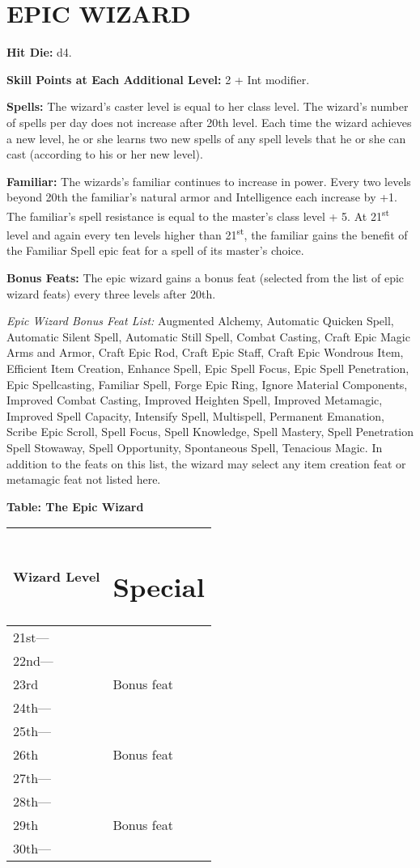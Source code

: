 \documentclass{article}
\begin{document}
\section*{{\LARGE{}EPIC WIZARD }}

\textbf{Hit Die:} d4. 

\textbf{Skill Points at Each Additional Level:} 2 + Int modifier. 

\textbf{Spells:} The wizard's caster level is equal to her class level. The wizard's 
number of spells per day does not increase after 20th level. Each time the wizard 
achieves a new level, he or she learns two new spells of any spell levels that 
he or she can cast (according to his or her new level). 

\textbf{Familiar:} The wizards's familiar continues to increase in power. Every 
two levels beyond 20th the familiar's natural armor and Intelligence each increase 
by +1. The familiar's spell resistance is equal to the master's class level + 5. 
At 21\textsuperscript{st} level and again every ten levels higher than 21\textsuperscript{st}, 
the familiar gains the benefit of the Familiar Spell epic feat for a spell of its 
master's choice.

\textbf{Bonus Feats:} The epic wizard gains a bonus feat (selected from the list 
of epic wizard feats) every three levels after 20th. 

\textit{Epic Wizard Bonus Feat List: }Augmented Alchemy, Automatic Quicken Spell, 
Automatic Silent Spell, Automatic Still Spell, Combat Casting, Craft Epic Magic 
Arms and Armor, Craft Epic Rod, Craft Epic Staff, Craft Epic Wondrous Item, Efficient 
Item Creation, Enhance Spell, Epic Spell Focus, Epic Spell Penetration, Epic Spellcasting, 
Familiar Spell, Forge Epic Ring, Ignore Material Components, Improved Combat Casting, 
Improved Heighten Spell, Improved Metamagic, Improved Spell Capacity, Intensify 
Spell, Multispell, Permanent Emanation, Scribe Epic Scroll, Spell Focus, Spell 
Knowledge, Spell Mastery, Spell Penetration Spell Stowaway, Spell Opportunity, 
Spontaneous Spell, Tenacious Magic. In addition to the feats on this list, the 
wizard may select any item creation feat or metamagic feat not listed here. 

\textbf{Table: The Epic Wizard }

\begin{tabular}{|>{\raggedright}p{38pt}|>{\raggedright}p{60pt}|}
\hline
W\textbf{izard Level} & \section*{S\textbf{pecial }}\tabularnewline
\hline
21st--- &  \tabularnewline
\hline
22nd--- &  \tabularnewline
\hline
23rd & Bonus feat \tabularnewline
\hline
24th--- &  \tabularnewline
\hline
25th--- &  \tabularnewline
\hline
26th & Bonus feat \tabularnewline
\hline
27th--- &  \tabularnewline
\hline
28th--- &  \tabularnewline
\hline
29th & Bonus feat \tabularnewline
\hline
30th--- &  \tabularnewline
\hline
\end{tabular}
\end{document}
